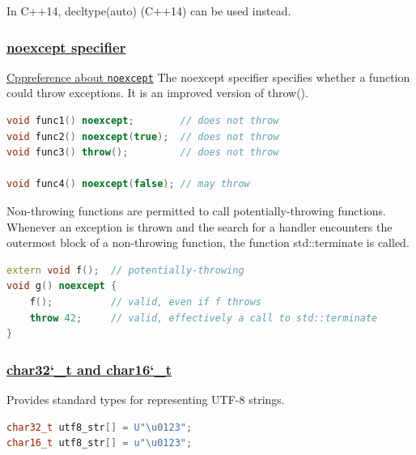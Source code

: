 In C++14, decltype(auto) (C++14) can be used instead.


\subsubsection{\href{https://github.com/AnthonyCalandra/modern-cpp-features/tree/master\#noexcept-specifier}
                    {noexcept specifier}}
\href{https://en.cppreference.com/w/cpp/language/noexcept}{Cppreference about \texttt{noexcept}}
The noexcept specifier specifies whether a function could throw exceptions. It is an improved version of throw().
\begin{lstlisting}[language=C++]
void func1() noexcept;        // does not throw
void func2() noexcept(true);  // does not throw
void func3() throw();         // does not throw

void func4() noexcept(false); // may throw
\end{lstlisting}
Non-throwing functions are permitted to call potentially-throwing functions. Whenever an exception is thrown and the search for a handler encounters the outermost block of a non-throwing function, the function std::terminate is called.
\begin{lstlisting}[language=C++]
extern void f();  // potentially-throwing
void g() noexcept {
    f();          // valid, even if f throws
    throw 42;     // valid, effectively a call to std::terminate
}
\end{lstlisting}

\subsubsection{\href{https://github.com/AnthonyCalandra/modern-cpp-features/tree/master\#char32_t-and-char16_t}
                    {char32\char`_t and char16\char`_t}}
Provides standard types for representing UTF-8 strings.
\begin{lstlisting}[language=C++]
char32_t utf8_str[] = U"\u0123";
char16_t utf8_str[] = u"\u0123";
\end{lstlisting}

